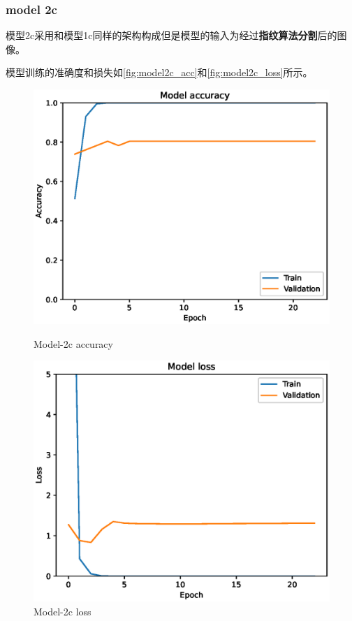 \subsubsection{model 2c}

模型2c采用和模型1c同样的架构构成但是模型的输入为经过\textbf{指纹算法分割}后的图像。

模型训练的准确度和损失如\autoref{fig:model2c_acc}和\autoref{fig:model2c_loss}所示。

\begin{figure}
    \centering
    \begin{minipage}{0.45\textwidth}
        \centering
        \includegraphics[width=\textwidth]{./fig/model2/accuracy2c.eps}
        \caption{Model-2c accuracy}
        \label{fig:model2c_acc}
    \end{minipage}
    \begin{minipage}{0.45\textwidth}
        \centering
        \includegraphics[width=\textwidth]{./fig/model2/loss2c.eps}
        \caption{Model-2c loss}
        \label{fig:model2c_loss}
    \end{minipage}
\end{figure}




